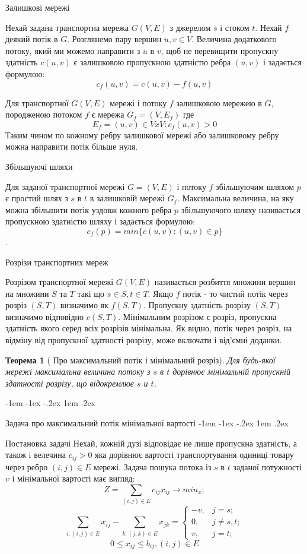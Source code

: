 \documentclass[a4paper,14pt,russian,ukrainian,oneside,final]{extreport}
\makeatletter
\newlength{\fivecharsapprox}
\newlength{\fivecharsapproxs}
\renewcommand\section{%
  \clearpage\@startsection {section}{0}%
    {\fivecharsapproxs}%
    {-1em \@plus -1ex \@minus -.2ex}%
    {1em \@plus .2ex}%
    {\raggedright\hyphenpenalty=10000\normalfont\large\bfseries\MakeUppercase {}}
}
\renewcommand\subsection{%
  \@startsection{subsection}{2}%
    {\fivecharsapprox}%
    {-1em \@plus -1ex \@minus -.2ex}%
    {1em \@plus .2ex}%
    {\raggedright\hyphenpenalty=10000\normalfont\normalsize\bfseries}}
\makeatother
\begin{document}
\indent Залишкові мережі

\indent Нехай задана транспортна мережа $G(V,E)$ з джерелом $s$ і стоком $t$. Нехай $f$ деякий потік в $G$.
Розглянемо пару вершин $u,v \in V$. Величина додаткового потоку, який ми можемо 
направити з $u$ в $v$, щоб не перевищити пропускну здатність $c(u,v)$ є залишковою 
пропускною здатністю ребра $(u,v)$ і задається формулою:
$$c_{f}(u,v)=c(u,v)-f(u,v)$$

Для транспортної $G(V,E)$ мережі і потоку $f$ залишковою мережею в $G$, породженою потоком $f$ є мережа 
$G_{f}=(V,E_{f})$  где $$E_{f}=(u,v)\in VxV:c_{f}(u,v)>0$$
Таким чином по кожному ребру залишкової мережі або залишковому ребру можна направити потік більше нуля.

\indent Збільшуючі шляхи

\indent Для заданої транспортної мережі $G=(V,E)$ і потоку $f$ збільшуючим шляхом $p$ є простий шлях з $s$ в $t$ в залишковій мережі $G_{f}$.
Максимальна величина, на яку можна збільшити потік уздовж кожного ребра $p$ збільшуючого шляху називається пропускною здатністю шляху і задається формулою:
$$c_{f}(p)=min\{c(u,v):(u,v)\in p\}$$.

\indent Розрізи транспортних мереж

\indent Розрізом транспортної мережі $G(V,E)$ називається розбиття множини вершин на множини $S$ та $T$ такі що $s\in S, t\in T$.
Якщо $f$ потік - то чистий потік через розріз $(S,T)$ визначимо як $f(S,T)$.
Пропускну здатність розрізу $(S,T)$ визначимо відповідно $c(S,T)$.
Мінімальним розрізом є розріз, пропускна здатність якого серед всіх розрізів мінімальна. Як видно, 
потік через розріз, на відміну від пропускної здатності розрізу, може включати і від’ємні доданки.
\newtheorem{theorem}{Теорема}
\begin{theorem}[ Про максимальний потік і мінімальний розріз]
Для будь-якої мережі максимальна величина потоку з $s$ в $t$ 
дорівнює мінімальній пропускній здатності розрізу, що відокремлює $s$ и $t$.  \cite{ford}
\end{theorem}


\section{ Задача про максимальний потік мінімальної вартості}
\subsection{Постановка задачі}
Нехай, кожній дузі відповідає не лише пропускна здатність, а також і велечина $c_{ij}>0$ яка дорівнює вартості транспортування одиниці товару через ребро $(i,j)\in E$ мережі.
Задача пошука потока  із $s$ в $t$ заданої потужності $v$  і мінімальної вартості має вигляд:
$$Z=\sum_{(i,j)\in E} c_{ij}x_{ij}\to min_{x};$$
$$\sum_{i:(i,j)\in E}x_{ij}-\sum_{k:(j,k)\in E}x_{jk}=
 \begin{cases}
   -v, &j=s;\\
   0, &j \neq s,t;\\
   v,&j=t;
 \end{cases}$$
$$
0\leq x_{ij}\leq b_{ij}, (i,j)\in E
$$
\end{document}
